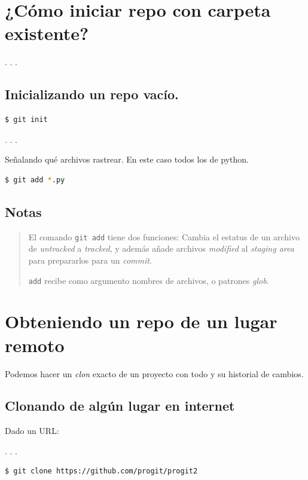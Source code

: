 \section{¿Cómo iniciar repo con carpeta existente?}

. . .

\subsection{Inicializando un repo vacío.}

\begin{lstlisting}[language=bash]
$ git init
\end{lstlisting}

. . .

Señalando qué archivos rastrear. En este caso todos los de python.

\begin{lstlisting}[language=bash]
$ git add *.py
\end{lstlisting}

\subsection{Notas}

\begin{quote}
El comando \passthrough{\lstinline!git add!} tiene dos funciones: Cambia
el estatus de un archivo de \emph{untracked} a \emph{tracked}, y además
añade archivos \emph{modified} al \emph{staging area} para prepararlos
para un \emph{commit}.

\passthrough{\lstinline!add!} recibe como argumento nombres de archivos,
o patrones \emph{glob}.
\end{quote}

\section{Obteniendo un repo de un lugar remoto}

Podemos hacer un \emph{clon} exacto de un proyecto con todo y su
historial de cambios.

\subsection{Clonando de algún lugar en internet}

Dado un URL:

. . .

\begin{lstlisting}
$ git clone https://github.com/progit/progit2
\end{lstlisting}

